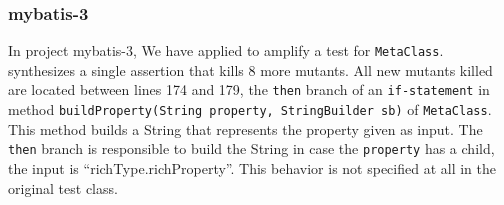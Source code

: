 \subsubsection{mybatis-3}


In project mybatis-3, We have applied \dspot to amplify a test for \texttt{MetaClass}. \dspot synthesizes a single assertion that kills 8 more mutants.
All new mutants killed are located between lines 174 and 179, \ie the \texttt{then} branch of an \texttt{if-statement} in method \texttt{buildProperty(String property, StringBuilder sb)} of \texttt{MetaClass}.
This method builds a String that represents the  property given as input. The  \texttt{then} branch is responsible to build  the String in case the \texttt{property} has a child, \eg the input is ``richType.richProperty''. This behavior is not specified at all in the original test class.


